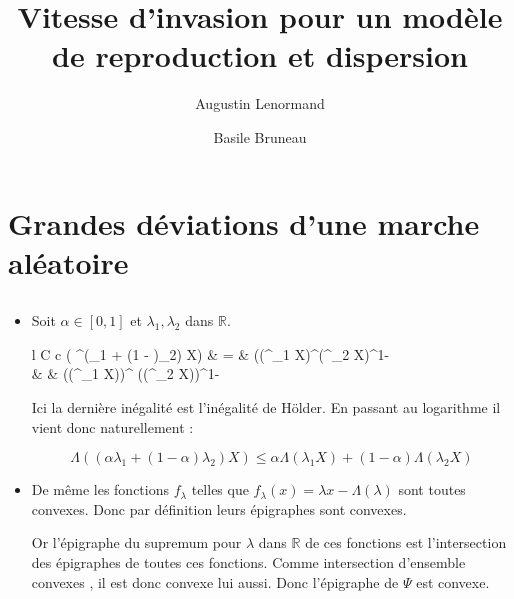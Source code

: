 \documentclass[12pt,titlepage=true]{article}
\title{Vitesse d'invasion pour un modèle de reproduction et dispersion}
\author{Augustin Lenormand \and Basile Bruneau}
\renewcommand\labelitemi{\textbullet}
\newcommand{\esp}{\mathbb{E}}
\renewcommand{\exp}{\mathrm{e}^}
\begin{document}
	\maketitle

	\section{Grandes déviations d'une marche aléatoire}
		\subsection{}\setcounter{equation}{0}
			
			\renewcommand\labelitemi{\textbullet}
			
			\begin{itemize}
	
				\item	Soit $\alpha\in [0,1]$ et $\lambda_1, \lambda_2$ dans $\mathbb{R}$.
	
						\begin{IEEEeqnarray*}{l C c}
							\esp( \exp{(\alpha \lambda_1 + (1 - \alpha)\lambda_2) X}) &     =     &  \esp((\exp{\lambda_1 X})^{\alpha}(\exp{\lambda_2 X})^{1-\alpha}\\
																   					  & \leqslant & (\esp(\exp{\lambda_1 X}))^{\alpha} (\esp(\exp{\lambda_2 X}))^{1- \alpha}
						\end{IEEEeqnarray*}
	
	
						Ici la dernière inégalité est l'inégalité de Hölder. En passant au logarithme il vient donc naturellement :	
	
						\begin{equation*}
							\Lambda((\alpha \lambda_1 + (1 - \alpha)\lambda_2) X) \leqslant \alpha \Lambda(\lambda_1 X) + (1-\alpha) \Lambda(\lambda_2 X)
						\end{equation*}
		
		
				\item	De même les fonctions $f_\lambda$ telles que $f_\lambda (x)=\lambda x - \Lambda (\lambda)$ sont toutes convexes. Donc par définition leurs épigraphes sont convexes.
			
						Or l'épigraphe du supremum pour $\lambda$ dans $\mathbb{R}$ de ces fonctions est l'intersection des épigraphes de toutes ces fonctions. Comme intersection d'ensemble convexes , il est donc convexe lui aussi. Donc l'épigraphe de $\Psi$ est convexe.
		


\end{itemize}
\end{document}
